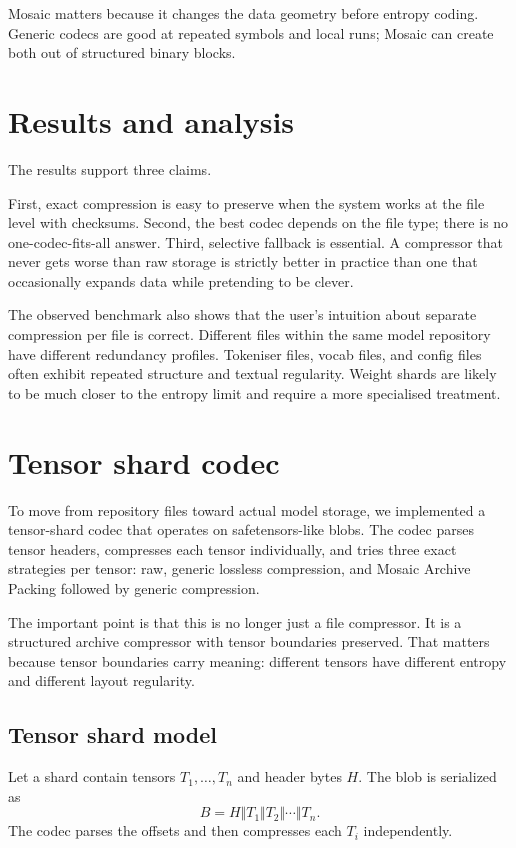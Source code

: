 \documentclass[11pt]{article}
\begin{document}
Mosaic matters because it changes the data geometry before entropy coding. Generic codecs are good at repeated symbols and local runs; Mosaic can create both out of structured binary blocks.

\section{Results and analysis}

The results support three claims.

First, exact compression is easy to preserve when the system works at the file level with checksums. Second, the best codec depends on the file type; there is no one-codec-fits-all answer. Third, selective fallback is essential. A compressor that never gets worse than raw storage is strictly better in practice than one that occasionally expands data while pretending to be clever.

The observed benchmark also shows that the user's intuition about separate compression per file is correct. Different files within the same model repository have different redundancy profiles. Tokeniser files, vocab files, and config files often exhibit repeated structure and textual regularity. Weight shards are likely to be much closer to the entropy limit and require a more specialised treatment.

\section{Tensor shard codec}

To move from repository files toward actual model storage, we implemented a tensor-shard codec that operates on safetensors-like blobs. The codec parses tensor headers, compresses each tensor individually, and tries three exact strategies per tensor: raw, generic lossless compression, and Mosaic Archive Packing followed by generic compression.

The important point is that this is no longer just a file compressor. It is a structured archive compressor with tensor boundaries preserved. That matters because tensor boundaries carry meaning: different tensors have different entropy and different layout regularity.

\subsection{Tensor shard model}
Let a shard contain tensors $T_1,\dots,T_n$ and header bytes $H$. The blob is serialized as
\[
B = H \Vert T_1 \Vert T_2 \Vert \cdots \Vert T_n.
\]
The codec parses the offsets and then compresses each $T_i$ independently.
\end{document}
